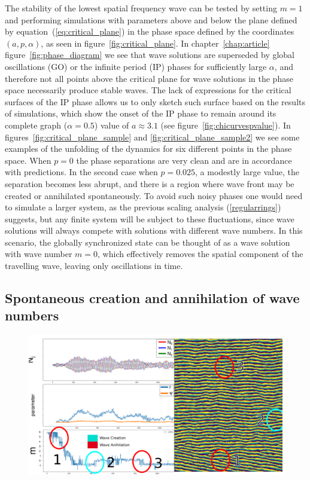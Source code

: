 The stability of the lowest spatial frequency wave can be tested by setting $m=1$ and performing simulations with parameters above and
below the plane defined by equation~(\ref{eq:critical_plane}) in the phase space defined by the coordinates $(a,p,\alpha)$, as seen in
figure~\ref{fig:critical_plane}. In chapter~\ref{chap:article} figure~\ref{fig:phase_diagram} we see that wave solutions are superseded
by global oscillations (GO) or the infinite period (IP) phases for sufficiently large $\alpha$, and therefore not all points above the
critical plane for wave solutions in the phase space necessarily produce stable waves. The lack of expressions for the critical
surfaces of the IP phase allows us to only sketch such surface based on the results of simulations, which show the onset of the IP
phase to remain around its complete graph ($\alpha=0.5$) value of $a\approx3.1$ (see figure~\ref{fig:chicurvespvalue}). In
figures~\ref{fig:critical_plane_sample} and \ref{fig:critical_plane_sample2} we see some examples of the unfolding of the dynamics for
six different points in the phase space. When $p=0$ the phase separations are very clean and are in accordance with predictions. In the
second case when $p=0.025$, a modestly large value, the separation becomes less abrupt, and there is a region where wave front may be
created or annihilated spontaneously. To avoid such noisy phases one would need to simulate a larger system, as the previous scaling
analysis (\ref{regularrings}) suggests, but any finite system will be subject to these fluctuations, since wave solutions will always
compete with solutions with different wave numbers. In this scenario, the globally synchronized state can be thought of as a wave
solution with wave number $m=0$, which effectively removes the spatial component of the travelling wave, leaving only oscillations in
time.

\subsection*{Spontaneous creation and annihilation of wave numbers}

\begin{figure}
  \centering
  \includegraphics[width=\textwidth]{fig/chap4/annihilation.png}
  \caption{}
  \label{fig:annihilation}
\end{figure}

